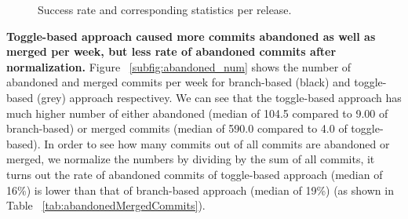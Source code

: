 \begin{figure}
\caption{Success rate and corresponding statistics per release.}
\label{fig:successRate}
\end{figure}


\textbf{Toggle-based approach caused more commits abandoned as well as merged per week, but less rate of abandoned commits after normalization.}
Figure ~\ref{subfig:abandoned_num} shows the number of abandoned and merged commits per week for branch-based (black) and toggle-based (grey) approach respectivey. We can see that the toggle-based approach has much higher number of either abandoned (median of 104.5 compared to 9.00 of branch-based) or merged commits (median of 590.0 compared to 4.0 of toggle-based). In order to see how many commits out of all commits are abandoned or merged, we normalize the numbers by dividing by the sum of all commits, it turns out the rate of abandoned commits of toggle-based approach (median of 16\%) is lower than that of branch-based approach (median of 19\%) (as shown in Table ~\ref{tab:abandonedMergedCommits}).


